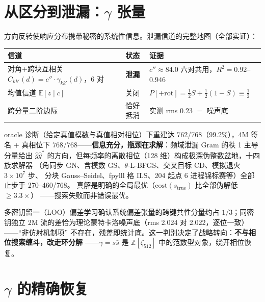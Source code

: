 \documentclass[UTF8,11pt,a4paper]{ctexart}
\begin{document}
\section{从区分到泄漏：$\gamma$ 张量}

方向反转使响应分布携带秘密的系统性信息。泄漏信道的完整地图（全部实证）：

\begin{table}[htbp]\centering\small
\begin{tabular}{@{}lll@{}}
\toprule
信道 & 状态 & 证据 \\
\midrule
对角$+$跨块互相关 $C_{kk'}(d) = c''\cdot\gamma_{kk'}(d)$，6 对 & \textbf{泄漏} & $c'' \approx 84.0$ 六对共用，$R^2 = 0.92$--$0.946$ \\
均值信道 $\mathbb{E}[z \mid c]$ & 关闭 & $P[+\mathrm{rot}] = \tfrac12 S + \tfrac12(1-S) \equiv \tfrac12$ \\
跨分量二阶边际 & 恰好抵消 & 实测 rms 0.23 $=$ 噪声底 \\
\bottomrule
\end{tabular}
\end{table}

oracle 诊断（给定真值模数与真值相对相位）下重建达 762/768（99.2\%），4M 签名 $+$
真相位下 768/768——\textbf{信息充分，瓶颈在求解}：频域泄漏 Gram 的秩 1 主导分量给出
$\hat g\hat g^*$ 的方向，但每频率的离散相位（128 维）构成极深伪整数盆地，十四族求解器
（角同步 GN、含模数 GS、$\theta$-L-BFGS、交叉目标 CD、模拟退火 $3\times10^7$ 步、
分块 Gauss--Seidel、fpylll 格 ILS、204 起点 6 进程锦标赛等）全部止步于 270--460/768。
真解是明确的全局最优（$\mathrm{cost}(s_{\mathrm{true}})$ 比全部伪解低 $\ge 3.3\times$）
——搜索失败而非错误最优。

多密钥留一（LOO）偏差学习确认系统偏差张量的跨键共性分量约占 $1/3$；同密钥独立 2M
流的差恰为理论蒙特卡洛噪声底（rms 2.024 对 2.022，逐位一致）——``非仿射机制项''
不存在，残差即统计底。这一判别决定了战略转向：\textbf{不与相位搜索缠斗，改走环分解}
——$\gamma = s\bar s$ 是 $\mathbb{Z}[\zeta_{512}]$ 中的范数型对象，绕开相位恢复。

\section{$\gamma$ 的精确恢复}
\end{document}
